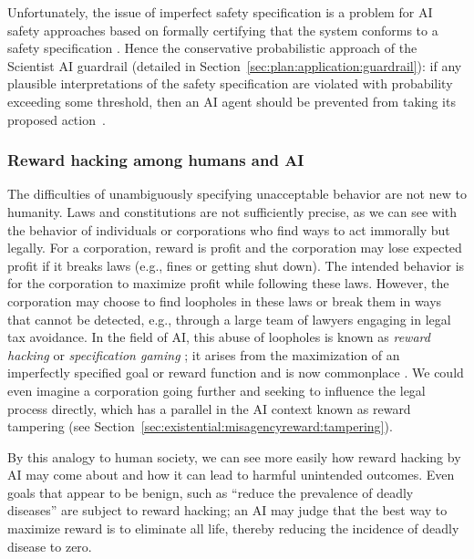 Unfortunately, the issue of imperfect safety specification is a problem for AI safety approaches based on formally certifying that the system conforms to a safety specification \cite{arxiv.org.abs.2405.06624}. Hence the conservative probabilistic approach of the Scientist AI guardrail (detailed in Section~\ref{sec:plan:application:guardrail}): if any plausible interpretations of the safety specification are violated with probability exceeding some threshold, then an AI agent should be prevented from taking its proposed action~\cite{bengio2024can}.

    \subsubsection{Reward hacking among humans and AI}
    \label{sec:existential:misagencyreward:hacking}


The difficulties of unambiguously specifying unacceptable behavior are not new to humanity. Laws and constitutions are not sufficiently precise, as we can see with the behavior of individuals or corporations who find ways to act immorally but legally.
For a corporation, reward is profit and the corporation may lose expected profit if it breaks laws (e.g., fines or getting shut down). The intended behavior is for the corporation to maximize profit while following these laws. However, the corporation may choose to find loopholes in these laws or break them in ways that cannot be detected, e.g., through a large team of lawyers engaging in legal tax avoidance. 
In the field of AI, this abuse of loopholes is known as \textit{reward hacking} or \textit{specification gaming} \cite{arxiv.org.abs.2209.13085,deepmind.google.discover.blog.specification.gaming.the.flip.side.of.ai.ingenuity}; it arises from the maximization of an imperfectly specified goal or reward function and is now commonplace \cite{openai.com.index.openai.o1.system.card,openai.com.index.faulty.reward.functions}.
We could even imagine a corporation going further and seeking to influence the legal process directly, which has a parallel in the AI context known as reward tampering (see Section~\ref{sec:existential:misagencyreward:tampering}).

By this analogy to human society, we can see more easily how reward hacking by AI may come about and how it can lead to harmful unintended outcomes. Even goals that appear to be benign, such as ``reduce the prevalence of deadly diseases'' are subject to reward hacking; an AI may judge that the best way to maximize reward is to eliminate all life, thereby reducing the incidence of deadly disease to zero.

